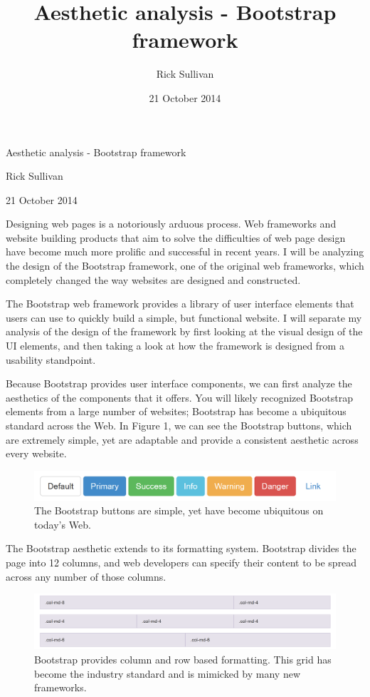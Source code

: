 \documentclass[letterpaper, 12pt]{article}
\title{Aesthetic analysis - Bootstrap framework}
\author{Rick Sullivan}
\date{21 October 2014}
\newcommand{\myDate}{21 October 2014}
\begin{document}
\begin{center}
\large{Aesthetic analysis - Bootstrap framework}

\normalsize{Rick Sullivan}

\myDate    
\end{center}

\vspace{2 ex}


Designing web pages is a notoriously arduous process. Web frameworks and website building products that aim to solve the difficulties of web page design have become much more prolific and successful in recent years. I will be analyzing the design of the Bootstrap framework, one of the original web frameworks, which completely changed the way websites are designed and constructed.


The Bootstrap web framework provides a library of user interface elements that users can use to quickly build a simple, but functional website. I will separate my analysis of the design of the framework by first looking at the visual design of the UI elements, and then taking a look at how the framework is designed from a usability standpoint.

Because Bootstrap provides user interface components, we can first analyze the aesthetics of the components that it offers. You will likely recognized Bootstrap elements from a large number of websites; Bootstrap has become a ubiquitous standard across the Web. In Figure 1, we can see the Bootstrap buttons, which are extremely simple, yet are adaptable and provide a consistent aesthetic across every website.

\begin{figure}[h]
\centering
\includegraphics{buttons.png}
\caption{The Bootstrap buttons are simple, yet have become ubiquitous on today's Web.}
\end{figure}

The Bootstrap aesthetic extends to its formatting system. Bootstrap divides the page into 12 columns, and web developers can specify their content to be spread across any number of those columns. 
\begin{figure}[h]
\centering
\includegraphics[width=\textwidth]{grid.png}
\caption{Bootstrap provides column and row based formatting. This grid has become the industry standard and is mimicked by many new frameworks.}
\end{figure}
\end{document}
